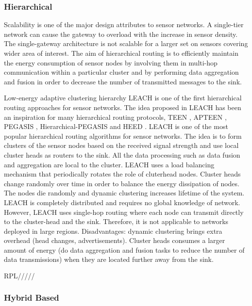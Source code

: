 \subsubsection{Hierarchical}
Scalability is one of the major design attributes to sensor networks. A single-tier network can cause the gateway to overload with the increase in sensor density. The single-gateway architecture is not scalable for a larger set on sensors covering wider area of interest. The aim of hierarchical routing is to efficiently maintain the energy consumption of sensor nodes by involving them in multi-hop communication within a particular cluster and by performing data aggregation and fusion in order to decrease the number of transmitted messages to the sink. 

Low-energy adaptive clustering hierarchy LEACH \cite{lifetimedef2} is one of the first hierarchical routing approaches for sensor networks. The idea proposed in LEACH has been an inspiration for many hierarchical routing protocols, TEEN \cite{teen}, APTEEN \cite{apteen}, PEGASIS \cite{pegasis}, Hierarchical-PEGASIS \cite{hpegasis} and HEED \cite{heed}. LEACH is one of the most popular hierarchical routing algorithms for sensor networks. The idea is to form clusters of the sensor nodes based on the received signal strength and use local cluster heads as routers to the sink. All the data processing such as data fusion and aggregation are local to the cluster. LEACH uses a load balancing mechanism that periodically rotates the role of cluterhead nodes. Cluster heads change randomly over time in order to balance the energy dissipation of nodes. The nodes die randomly and dynamic clustering increases lifetime of the system. LEACH is completely distributed and requires no global knowledge of network. However, LEACH uses single-hop routing where each node can transmit directly to the cluster-head and the sink. Therefore, it is not applicable to networks deployed in large regions.
Disadvantages: dynamic clustering brings extra overhead (head changes, advertisements). Cluster heads consumes a larger amount of energy (do data aggregation and fusion tasks to reduce the number of data transmissions) when they are located further away from the sink.

RPL/////

\subsubsection{Hybrid Based}
